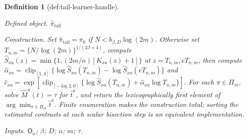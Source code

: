 \documentclass{article}
\newtheorem{definition}{Definition}
\begin{document}
\begin{definition}[def:tail-learner-handle]\label{def:tail-learner-handle}
\par\smallskip\noindent\emph{Defined object.} \(\widehat\pi_{\mathrm{tail}}\)
\par\smallskip\noindent\emph{Construction.} Set \(\widehat\pi_{\mathrm{tail}}=\pi_0\) if \(N<b_{\beta,D}\log(2m)\). Otherwise set \(T_{n,m}=\{N/\log(2m)\}^{1/(2\beta+4)}\), compute \(\widehat S_{xa}(z)=\min\{1,(2m/n)[K_{xa}(z)+1]\}\) at \(z=T_{n,m},eT_{n,m}\), then compute \(\widehat\alpha_{xa}=\operatorname{clip}_{[1,4]}\{\log\widehat S_{xa}(T_{n,m})-\log\widehat S_{xa}(eT_{n,m})\}\) and \(\widehat c_{xa}=\exp[\operatorname{clip}_{[-\log2,0]}\{\log\widehat S_{xa}(T_{n,m})+\widehat\alpha_{xa}\log T_{n,m}\}]\). For each \(\pi\in\Pi_m\), solve \(\widehat M^{\pi}(t)=\tau\) for \(\widehat t^{\pi}\), and return the lexicographically first element of \(\arg\min_{\pi\in\Pi_m}\widehat t^{\pi}\). Finite enumeration makes the construction total; sorting the estimated contrasts at each scalar bisection step is an equivalent implementation.
\par\smallskip\noindent\emph{Inputs.} \(\mathsf O_n\); \(\beta\); \(D\); \(n\); \(m\); \(\tau\).
\end{definition}
\end{document}
